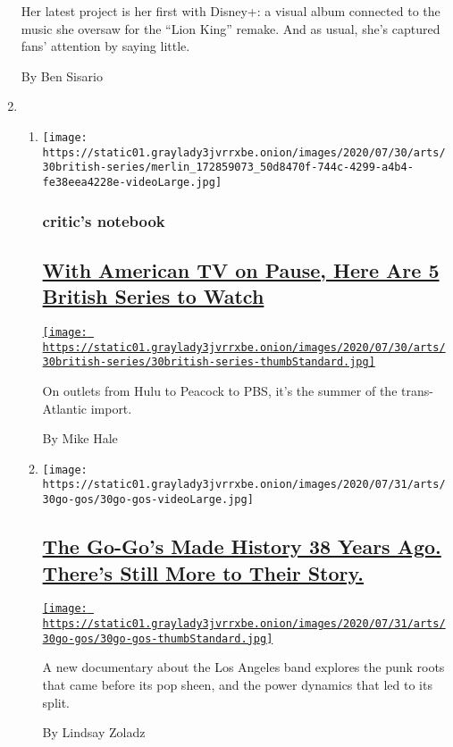 \begin{enumerate}
  Her latest project is her first with Disney+: a visual album connected
  to the music she oversaw for the ``Lion King'' remake. And as usual,
  she's captured fans' attention by saying little.

  By Ben Sisario
\item
  \begin{enumerate}
  \def\labelenumii{\arabic{enumii}.}
  \item
    \texttt{[image: https://static01.graylady3jvrrxbe.onion/images/2020/07/30/arts/30british-series/merlin\_172859073\_50d8470f-744c-4299-a4b4-fe38eea4228e-videoLarge.jpg]}

    \hypertarget{critics-notebook}{%
    \subsubsection{critic's notebook}\label{critics-notebook}}

    \hypertarget{with-american-tv-on-pause-here-are-5-british-series-to-watch}{%
    \subsection{\texorpdfstring{\href{/2020/07/30/arts/television/in-my-skin-hulu.html}{With
    American TV on Pause, Here Are 5 British Series to
    Watch}}{With American TV on Pause, Here Are 5 British Series to Watch}}\label{with-american-tv-on-pause-here-are-5-british-series-to-watch}}

    \href{/2020/07/30/arts/television/in-my-skin-hulu.html}{\texttt{[image: https://static01.graylady3jvrrxbe.onion/images/2020/07/30/arts/30british-series/30british-series-thumbStandard.jpg]}}

    On outlets from Hulu to Peacock to PBS, it's the summer of the
    trans-Atlantic import.

    By Mike Hale
  \item
    \texttt{[image: https://static01.graylady3jvrrxbe.onion/images/2020/07/31/arts/30go-gos/30go-gos-videoLarge.jpg]}

    \hypertarget{the-go-gos-made-history-38-years-ago-theres-still-more-to-their-story}{%
    \subsection{\texorpdfstring{\href{/2020/07/29/arts/music/the-go-gos-documentary.html}{The
    Go-Go's Made History 38 Years Ago. There's Still More to Their
    Story.}}{The Go-Go's Made History 38 Years Ago. There's Still More to Their Story.}}\label{the-go-gos-made-history-38-years-ago-theres-still-more-to-their-story}}

    \href{/2020/07/29/arts/music/the-go-gos-documentary.html}{\texttt{[image: https://static01.graylady3jvrrxbe.onion/images/2020/07/31/arts/30go-gos/30go-gos-thumbStandard.jpg]}}

    A new documentary about the Los Angeles band explores the punk roots
    that came before its pop sheen, and the power dynamics that led to
    its split.

    By Lindsay Zoladz
  \end{enumerate}
\end{enumerate}

